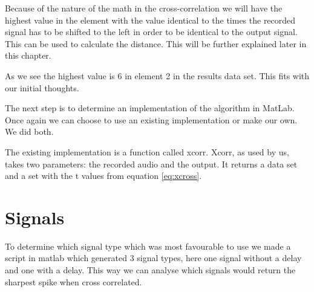 Because of the nature of the math in the cross-correlation we will have the highest value in the element with the value identical to the times the recorded signal has to be shifted to the left in order to be identical to the output signal. This can be used to calculate the distance. This will be further explained later in this chapter.

As we see the highest value is 6 in element 2 in the results data set. This fits with our initial thoughts.

The next step is to determine an implementation of the algorithm in MatLab. Once again we can choose to use an existing implementation or make our own. We did both.

The existing implementation is a function called xcorr. Xcorr, as used by us, takes two parameters: the recorded audio and the output. It returns a data set and a set with the t values from equation \ref{eq:xcross}.

\section{Signals}
To determine which signal type which was most favourable to use we made a script in matlab which generated 3 signal types, here one signal without a delay and one with a delay. This way we can analyse which signals would return the sharpest spike when cross correlated.

